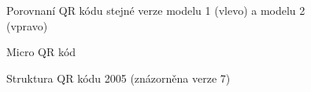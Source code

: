 \begin{figure}[H]
  \begin{center}
    \caption{Porovnaní QR kódu stejné verze modelu 1 (vlevo) a modelu 2 (vpravo)}
    \label{QRCodeModel12Comparision}
  \end{center}
\end{figure}

\begin{figure}[H]
  \begin{center}
    \caption{Micro QR kód}
    \label{microQRIntroducion}
  \end{center}
\end{figure}

\begin{figure}[H]
  \begin{center}
    \caption{Struktura QR kódu 2005 (znázorněna verze 7)}
    \label{QRCodesStructure}
  \end{center}
\end{figure}

